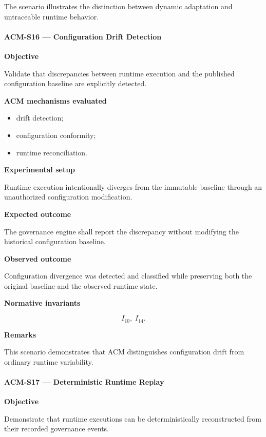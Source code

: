 \documentclass[10pt]{article}
\begin{document}
The scenario illustrates the distinction between dynamic adaptation and
untraceable runtime behavior.

\paragraph{ACM-S16 --- Configuration Drift Detection}

\textbf{Objective}

Validate that discrepancies between runtime execution and the published
configuration baseline are explicitly detected.

\textbf{ACM mechanisms evaluated}

\begin{itemize}
    \item drift detection;
    \item configuration conformity;
    \item runtime reconciliation.
\end{itemize}

\textbf{Experimental setup}

Runtime execution intentionally diverges from the immutable baseline through an
unauthorized configuration modification.

\textbf{Expected outcome}

The governance engine shall report the discrepancy without modifying the
historical configuration baseline.

\textbf{Observed outcome}

Configuration divergence was detected and classified while preserving both the
original baseline and the observed runtime state.

\textbf{Normative invariants}

\[
I_{10},\;
I_{14}.
\]

\textbf{Remarks}

This scenario demonstrates that ACM distinguishes configuration drift from
ordinary runtime variability.

\paragraph{ACM-S17 --- Deterministic Runtime Replay}

\textbf{Objective}

Demonstrate that runtime executions can be deterministically reconstructed from
their recorded governance events.
\end{document}

